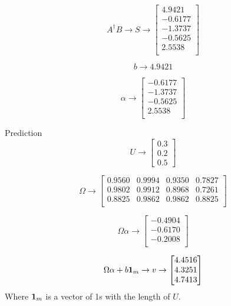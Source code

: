 \begin{equation}
  A^{\dag}B\to S\to
  \begin{bmatrix}
    4.9421  \\
    -0.6177 \\
    -1.3737 \\
    -0.5625 \\
    2.5538  \\
  \end{bmatrix}
\end{equation}

\begin{equation}
  b\to 4.9421
\end{equation}

\begin{equation}
  \alpha \to
  \begin{bmatrix}
    -0.6177 \\
    -1.3737 \\
    -0.5625 \\
    2.5538  \\
  \end{bmatrix}
\end{equation}

Prediction
\begin{equation}
  U\to
  \begin{bmatrix}
    0.3 \\
    0.2 \\
    0.5
  \end{bmatrix}
\end{equation}

\begin{equation}
  \Omega\to
  \begin{bmatrix}
    0.9560 & 0.9994 & 0.9350 & 0.7827 \\
    0.9802 & 0.9912 & 0.8968 & 0.7261 \\
    0.8825 & 0.9862 & 0.9862 & 0.8825 \\
  \end{bmatrix}
\end{equation}

\begin{equation}
  \Omega\alpha\to
  \begin{bmatrix}
    -0.4904 \\
    -0.6170 \\
    -0.2008 \\
  \end{bmatrix}
\end{equation}

\begin{equation}
  \Omega\alpha+b\vb{1}_{m}\to v\to
  \begin{bmatrix}
    4.4516 \\
    4.3251 \\
    4.7413 \\
  \end{bmatrix}
\end{equation}
Where $\vb{1}_{m}$ is a vector of 1s with the length of $U$.

